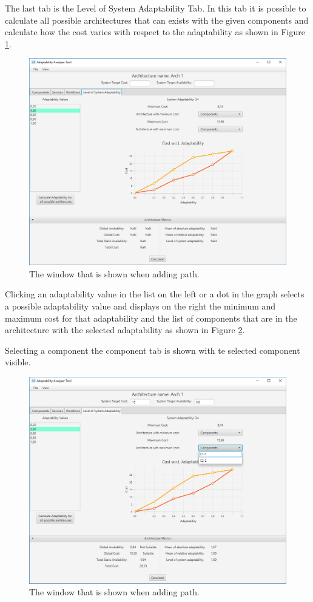 The last tab is the Level of System Adaptability Tab. In this tab it is possible to calculate all possible architectures that can exists with the given components and calculate how the cost varies with respect to the adaptability as shown in Figure \ref{fig:adapt-wrt-avail}. 

\begin{figure}[!ht]
	\centerline
	{\includegraphics[scale=0.50]{img/adapt_wrt_avail.png}}
	\caption[Add path window]{The window that is shown when adding path.}
	\label{fig:adapt-wrt-avail}
\end{figure}

Clicking an adaptability value in the list on the left or a dot in the graph selects a possible adaptability value and displays on the right the minimum and maximum cost for that adaptability and the list of components that are in the architecture with the selected adaptability as shown in Figure \ref{fig:adapt-wrt-avail-comp}. 

Selecting a component the component tab is shown with te selected component visible.

\begin{figure}[!ht]
	\centerline
	{\includegraphics[scale=0.50]{img/adapt_wrt_avail_comp.png}}
	\caption[Add path window]{The window that is shown when adding path.}
	\label{fig:adapt-wrt-avail-comp}
\end{figure}